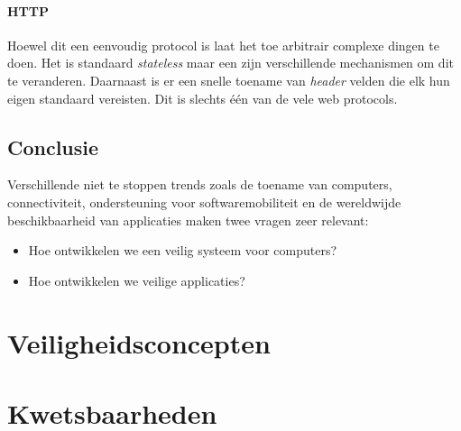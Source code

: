 \documentclass[../main.tex]{subfiles}
\begin{document}
\paragraph{HTTP} Hoewel dit een eenvoudig protocol is laat het toe arbitrair complexe dingen te doen. Het is standaard \textit{stateless} maar een zijn verschillende mechanismen om dit te veranderen. Daarnaast is er een snelle toename van \textit{header} velden die elk hun eigen standaard vereisten. Dit is slechts \'e\'en van de vele web protocols.

\subsection{Conclusie}
Verschillende niet te stoppen trends zoals de toename van computers, connectiviteit, ondersteuning voor softwaremobiliteit en de wereldwijde beschikbaarheid van applicaties maken twee vragen zeer relevant:
\begin{itemize}
	\item Hoe ontwikkelen we een veilig systeem voor computers?
	\item Hoe ontwikkelen we veilige applicaties?
\end{itemize}

\section{Veiligheidsconcepten}
\section{Kwetsbaarheden}
\end{document}
